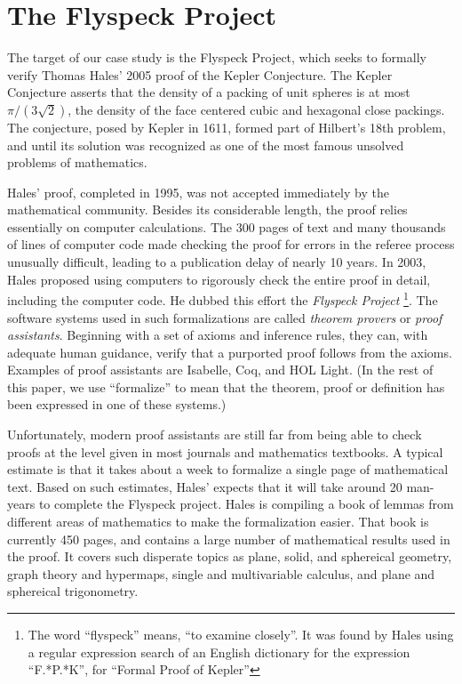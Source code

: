 
\section{The Flyspeck Project}
\label{sec:flyspeck}

The target of our case study is the Flyspeck Project, which seeks to
formally verify Thomas Hales' 2005 proof of the Kepler Conjecture.
The Kepler Conjecture asserts that the density of a packing of unit
spheres is at most $\pi/(3\sqrt{2})$, the density of the face centered
cubic and hexagonal close packings.  The conjecture, posed by Kepler
in 1611, formed part of Hilbert's 18th problem, and until its solution
was recognized as one of the most famous unsolved problems of
mathematics.

  Hales' proof, completed in 1995, was not accepted immediately by the mathematical community. 
Besides its considerable length,  the proof relies essentially on computer calculations.  
The 300 pages of text and many thousands of lines of computer code made
checking the proof for errors in the referee process unusually difficult,
leading to a publication delay of nearly 10 years.  
In 2003, Hales proposed using computers to rigorously check the entire proof in
detail, including the computer code.  He dubbed this
effort the \textit{Flyspeck Project}
\footnote{The word ``flyspeck'' means, ``to examine closely''.  It was found
by Hales using a regular expression search of an English dictionary for the
expression ``F.*P.*K'', for ``Formal Proof of Kepler''}.  
The software systems used in such formalizations are called \textit{theorem provers}
or \textit{proof assistants}.
Beginning with a set of axioms and inference rules, they can,
with adequate human guidance, verify that a purported proof follows from the axioms.  
Examples of proof assistants are Isabelle\cite{Paulson:1994:Isabelle}, 
Coq\cite{Bertot:2004:CoqBook}, 
and HOL Light\cite{Harrison:2000:HOL-Light}. (In the rest of this paper, we use ``formalize'' to mean
that the theorem, proof or definition has been expressed in one of these systems.) 

  Unfortunately, modern proof assistants are still far from being able to check
proofs at the level given in most journals and mathematics textbooks.  A typical
estimate is that it takes about a week to formalize a single page of mathematical
text.  Based on such estimates, Hales' expects that it will take 
around 20 man-years to complete the Flyspeck project.  
Hales is compiling a book\cite{Hales:2007:FlyspeckBook}
of lemmas from different areas of mathematics to make the formalization easier.    
That book is currently 450 pages, and contains a large number of mathematical
results used in the proof.  It covers such disperate topics
as plane, solid, and sphereical geometry, graph theory and hypermaps, single and
multivariable calculus, and plane and sphereical trigonometry.

